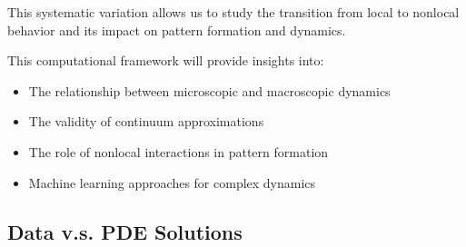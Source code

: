\documentclass[11pt,a4paper]{article}
\begin{document}
This systematic variation allows us to study the transition from local to nonlocal behavior and its impact on pattern formation and dynamics.

This computational framework will provide insights into:

\begin{itemize}
    \item The relationship between microscopic and macroscopic dynamics
    \item The validity of continuum approximations
    \item The role of nonlocal interactions in pattern formation
    \item Machine learning approaches for complex dynamics
\end{itemize}

\subsection{Data v.s. PDE Solutions}
\end{document}
